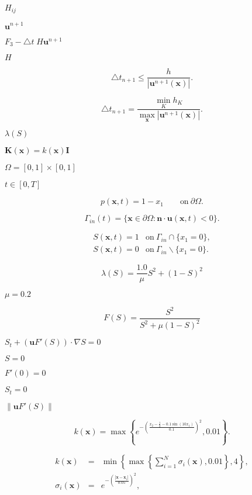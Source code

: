 \documentclass{article}
\begin{document}
$H_{ij}$
\pagebreak

$\mathbf u^{n+1}$
\pagebreak

$F_3-\triangle t\; H \mathbf u^{n+1}$
\pagebreak

$H$
\pagebreak

\[ \triangle t_{n+1} \le \frac h{|\mathbf{u}^{n+1}(\mathbf{x})|}. \]
\pagebreak

\[ \triangle t_{n+1} = \frac {\min_K h_K}{\max_{\mathbf{x}}|\mathbf{u}^{n+1}(\mathbf{x})|}. \]
\pagebreak

$\lambda(S)$
\pagebreak

$\mathbf{K}(\mathbf{x}) = k(\mathbf{x}) \mathbf{I}$
\pagebreak

$\Omega = [0,1]\times [0,1]$
\pagebreak

$t\in [0,T]$
\pagebreak

\[ p(\mathbf{x},t)=1-x_1 \qquad \textrm{on}\ \partial\Omega. \]
\pagebreak

\[ \Gamma_{in}(t) = \{\mathbf{x}\in\partial\Omega: \mathbf{n} \cdot \mathbf{u}(\mathbf{x},t) < 0\}. \]
\pagebreak

\begin{eqnarray} S(\mathbf{x},t) = 1 & \textrm{on}\ \Gamma_{in}\cap\{x_1=0\}, \\ S(\mathbf{x},t) = 0 & \textrm{on}\ \Gamma_{in}\backslash \{x_1=0\}. \end{eqnarray}
\pagebreak

\[ \lambda (S) = \frac{1.0}{\mu} S^2 +(1-S)^2 \]
\pagebreak

$\mu=0.2$
\pagebreak

\[ F(S)=\frac{S^2}{S^2+\mu (1-S)^2} \]
\pagebreak

$S_{t} + (\mathbf{u} F'(S)) \cdot \nabla S = 0$
\pagebreak

$S=0$
\pagebreak

$F'(0)=0$
\pagebreak

$S_t=0$
\pagebreak

$\|\mathbf u F'(S)\|$
\pagebreak

\[ k(\mathbf x) = \max \left\{ e^{-\left(\frac{x_2-\frac 12 - 0.1\sin(10x_1)}{0.1}\right)^2}, 0.01 \right\}. \]
\pagebreak

\begin{eqnarray*} k(\mathbf x) &=& \min \left\{ \max \left\{ \sum_{i=1}^N \sigma_i(\mathbf{x}), 0.01 \right\}, 4\right\}, \\ \sigma_i(\mathbf x) &=& e^{-\left(\frac{|\mathbf{x}-\mathbf{x}_i|}{0.05}\right)^2}, \end{eqnarray*}
\pagebreak
\end{document}
